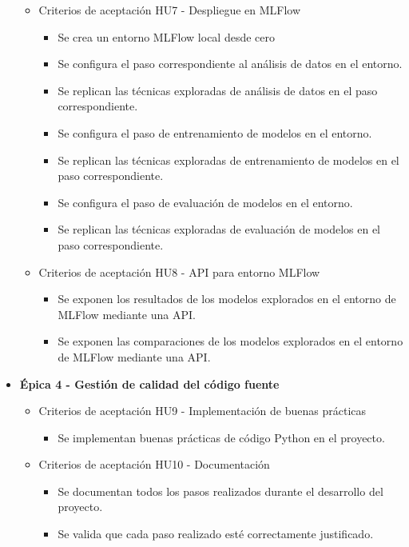 \documentclass[
11pt, %
]{charter}
\begin{document}
\begin{itemize}
\begin{itemize}
      \item Criterios de aceptación HU7 - Despliegue en MLFlow
        \begin{itemize}
            \item Se crea un entorno MLFlow local desde cero
            \item Se configura el paso correspondiente al análisis de datos en el entorno.
            \item Se replican las técnicas exploradas de análisis de datos en el paso correspondiente.
            \item Se configura el paso de entrenamiento de modelos en el entorno.
            \item Se replican las técnicas exploradas de entrenamiento  de modelos en el paso correspondiente.
            \item Se configura el paso de evaluación de modelos en el entorno.
            \item Se replican las técnicas exploradas de evaluación de modelos en el paso correspondiente.
        \end{itemize}
      \item Criterios de aceptación HU8 - API para entorno MLFlow
        \begin{itemize}
            \item Se exponen los resultados de los modelos explorados en el entorno de MLFlow mediante una API.
            \item Se exponen las comparaciones de los modelos explorados en el entorno de MLFlow mediante una API.
        \end{itemize}
    \end{itemize}
  \item \textbf{\'{E}pica 4 - Gestión de calidad del código fuente}
    \begin{itemize}
      \item Criterios de aceptación HU9 - Implementación de buenas prácticas
        \begin{itemize}
            \item Se implementan buenas prácticas de código Python en el proyecto.
        \end{itemize}
      \item Criterios de aceptación HU10 - Documentación
        \begin{itemize}
            \item Se documentan todos los pasos realizados durante el desarrollo del proyecto.
            \item Se valida que cada paso realizado esté correctamente justificado.

\end{itemize}
\end{itemize}
\end{itemize}
\end{document}
